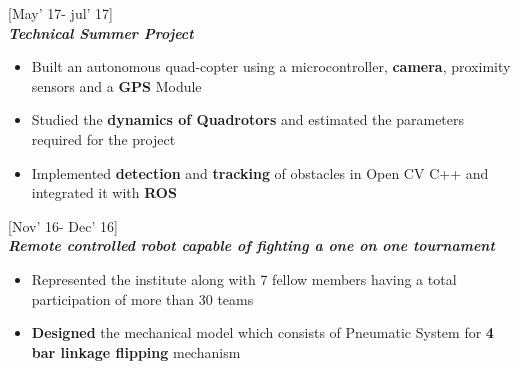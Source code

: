 \documentclass{article}
\begin{document}
 \hfill{\small [May' 17- jul' 17]}\\
{\it \textbf{Technical Summer Project}} \\
\vspace{-17pt}
\begin{itemize}[itemsep = -0.75 mm, leftmargin=*]
\item Built an autonomous quad-copter using a microcontroller, {\bf camera}, proximity sensors and a {\bf GPS} Module
\item Studied the {\bf dynamics of Quadrotors} and estimated the parameters required for the project
\item Implemented {\bf detection} and {\bf tracking} of obstacles in Open CV C++ and integrated it with {\bf ROS}
\end{itemize}
 \hfill{\small [Nov' 16- Dec' 16]}\\
{\it \textbf{Remote controlled robot capable of fighting a one on one tournament}} \\
\vspace{-17pt}
\begin{itemize}[itemsep = -0.75 mm, leftmargin=*]
\item {Represented the institute along with 7 fellow members having a total participation of more than 30 teams}
\item {\bf Designed} the mechanical model which consists of Pneumatic System for {\bf 4 bar linkage flipping} mechanism
\end{itemize}
\vspace{-15pt}
\end{document}
